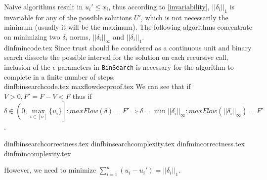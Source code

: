 \documentclass[11pt]{llncs}
\begin{document}
  Naive algorithms result in $u_i' \leq x_i$, thus according to \ref{invariability}, $||\delta_i||_1$ is invariable for
  any of the possible solutions $U'$, which is not necessarily the minimum (usually it will be the maximum). The following
  algorithms concentrate on minimizing two $\delta_i$ norms, $||\delta_i||_\infty$ and $||\delta_i||_1$. \\
  {dinfmincode.tex}
  Since trust should be considered as a continuous unit and binary search dissects the possible interval for the solution
  on each recursive call, inclusion of the $\epsilon$-parameters in \texttt{BinSearch} is necessary for the algorithm to
  complete in a finite number of steps. \\
  {dinfbinsearchcode.tex}
  {maxflowdecproof.tex}
  We can see that if $V > 0, F' = F - V < F$ thus if $\delta \in \left(0, \max\limits_{i \in [n]}\{u_i\}\right]:
  maxFlow\left(\delta\right) = F' \Rightarrow \delta = \min||\delta_i||_\infty :
  maxFlow\left(||\delta_{i}||_{\infty}\right) = F'$.

  {dinfbinsearchcorrectness.tex}
  {dinfbinsearchcomplexity.tex}
  {dinfmincorrectness.tex}
  {dinfmincomplexity.tex}

  However, we need to minimize $\sum\limits_{i=1}^{n}\left(u_i-u_i'\right) = ||\delta_i||_1$.
\end{document}
